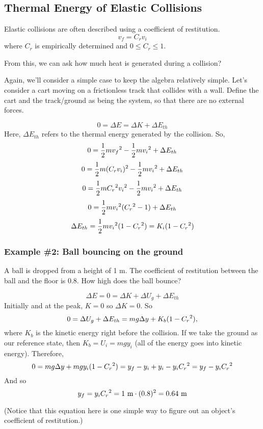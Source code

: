 \subsection{Thermal Energy of Elastic Collisions}
Elastic collisions are often described using a coefficient of restitution.
$$v_f=C_rv_i$$
where $C_r$ is empirically determined and $0\leq C_r \leq 1$.

From this, we can ask how much heat is generated during a collision?

Again, we'll consider a simple case to keep the algebra relatively simple. Let's consider a cart moving on a frictionless track that collides with a wall. Define the cart and the track/ground as being the system, so that there are no external forces.

$$0=\Delta{E}=\Delta{K}+\Delta{E_{th}}$$
Here, $\Delta{E_{th}}$ refers to the thermal energy generated by the collision. So,
$$0=\frac{1}{2}mv_f\displaystyle^2-\frac{1}{2}mv_i\displaystyle^2+\Delta{E_{th}}$$
$$0=\frac{1}{2}m(C_rv_i)\displaystyle^2-\frac{1}{2}mv_i\displaystyle^2+\Delta{E_{th}}$$
$$0=\frac{1}{2}mC_r\displaystyle^2v_i\displaystyle^2-\frac{1}{2}mv_i\displaystyle^2+\Delta{E_{th}}$$
$$0=\frac{1}{2}mv_i\displaystyle^2(C_r\displaystyle^2-1)+\Delta{E_{th}}$$
$$\Delta{E_{th}}=\frac{1}{2}mv_i\displaystyle^2(1-C_r\displaystyle^2)=K_i(1-C_r\displaystyle^2)$$

\subsubsection{Example \#2: Ball bouncing on the ground}
A ball is dropped from a height of 1 m. The coefficient of restitution between the ball and the floor is 0.8. How high does the ball bounce?

$$\Delta{E}=0=\Delta{K}+\Delta{U_g}+\Delta{E_{th}}$$
Initially and at the peak, $K=0$ so $\Delta{K}=0$. So
$$0=\Delta{U_g}+\Delta{E_{th}}=mg\Delta{y}+K_b(1-C_r\displaystyle^2),$$
where $K_b$ is the kinetic energy right before the collision. If we take the ground as our reference state, then $K_b=U_i=mgy_i$ (all of the energy goes into kinetic energy).  Therefore,
$$0=mg\Delta{y}+mgy_i(1-C_r\displaystyle^2)=y_f-y_i+y_i-y_iC_r\displaystyle^2=y_f-y_iC_r\displaystyle^2$$
And so
$$y_f=y_iC_r\displaystyle^2=1\mbox{ m}\cdot(0.8)^2=0.64\mbox{ m}$$

(Notice that this equation here is one simple way to figure out an object's coefficient of restitution.)





\clearpage
